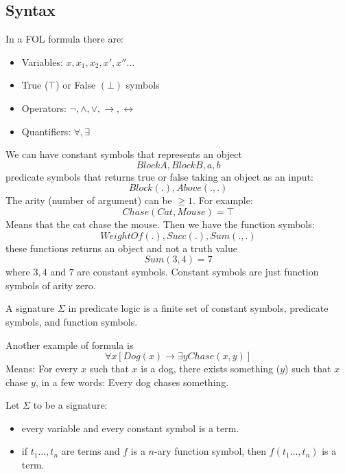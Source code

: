 \documentclass[10pt, letterpaper]{report}
\begin{document}
 \subsection{Syntax}
In a FOL formula there are:\begin{itemize}
    \item Variables: $x,x_1,x_2,x',x''\dots$
    \item True ($\top$) or False $(\bot)$ symbols 
    \item Operators: $\lnot,\land,\lor,\rightarrow,\leftrightarrow$
    \item Quantifiers: $\forall,\exists$
\end{itemize}
We can have constant symbols that represents an object\begin{equation}
    BlockA, BlockB, a, b
\end{equation}
predicate symbols that returns true or false taking an object as an input:\begin{equation}
    Block(.), Above(.,.)
\end{equation}
The arity (number of argument) can be $\ge 1$. For example:\begin{equation}
    Chase(Cat,Mouse)=\top 
\end{equation}
Means that the cat chase the mouse. Then we have the function symbols:\begin{equation}
    WeightOf(.), Succ(.), Sum(.,.)
\end{equation}
these functions returns an object and not a truth value\begin{equation}
    Sum(3,4)=7
\end{equation}
where $3,4$ and $7$ are constant symbols. Constant symbols are just function symbols of arity zero.\begin{definition}[Signature]
    A signature $\Sigma$ in predicate logic is a finite set
 of constant symbols, predicate symbols, and function symbols.
\end{definition}
Another example of formula is\begin{equation}
    \forall x[Dog(x)\rightarrow \exists y Chase(x,y)]
\end{equation}
Means: For every $x$ such that $x$ is a dog, there exists something ($y$) such that $x$ chase $y$, in a few words: Every
 dog chases something.\begin{definition}[Term]
    Let $\Sigma$ to be a signature:\begin{itemize}
        \item every variable and every constant symbol is a term.
        \item if $t_1\dots,t_n$ are terms and $f$ is a $n$-ary function symbol, then $f(t_1\dots,t_n)$ is a term.
    \end{itemize}
 \end{definition}
\end{document}
